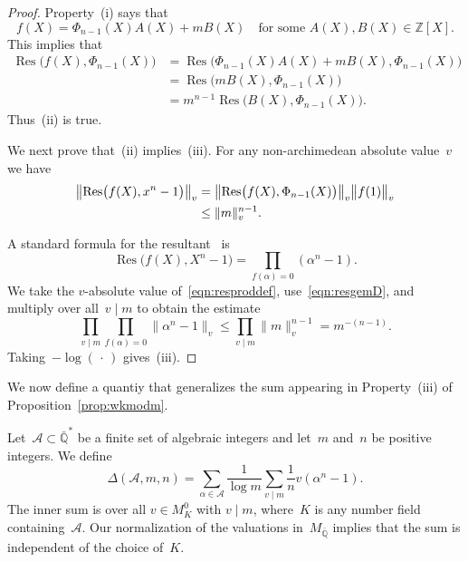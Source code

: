 \begin{proof}
Property~(i) says that
\[
  f(X) = {\Phi}_{n-1}(X)A(X) + mB(X)
  \quad\text{for some $A(X),B(X)\in{\mathbb{Z}}[X]$.}
\]
This implies that
\begin{align*}
  {\operatorname{Res}}\bigl(f(X),{\Phi}_{n-1}(X)\bigr)
  &= {\operatorname{Res}}\bigl({\Phi}_{n-1}(X)A(X) + mB(X),{\Phi}_{n-1}(X)\bigr)\\
  &= {\operatorname{Res}}\bigl(mB(X),{\Phi}_{n-1}(X)\bigr)\\
  &= m^{n-1} {\operatorname{Res}}\bigl(B(X),{\Phi}_{n-1}(X)\bigr).
\end{align*}
Thus~(ii) is true. 
\par
We next prove that~(ii) implies~(iii).  For any non-archimedean
absolute value~$v$ we have
\begin{align}
  \label{eqn:resgemD}
  \bigl\|{\operatorname{Res}}\bigl(f(X),x^{n}-1\bigr)\bigr\|_v
  &= \bigl\|{\operatorname{Res}}\bigl(f(X),{\Phi}_{n-1}(X)\bigr)\bigr\|_v
     \bigl\|f(1)\bigr\|_v  \notag\\*
  &\le \|m\|_v^{n-1}.
\end{align}
\par
A standard formula for the resultant~\cite[Section~V.10]{lang:algebra}
is
\begin{equation}
  \label{eqn:resproddef}
  {\operatorname{Res}}\bigl(f(X),X^{n}-1\bigr)
  = \prod_{f({\alpha})=0} ({\alpha}^{n}-1).
\end{equation}
We take the $v$-absolute value of~\eqref{eqn:resproddef},
use~\eqref{eqn:resgemD}, and multiply over all~$v\mid m$ to obtain the
estimate
\begin{equation}
  \label{eqnvmiDaizv}
  \prod_{v\mid m} \prod_{f({\alpha})=0} \|{\alpha}^{n}-1\|_v
  \le \prod_{v\mid m} \|m\|_v^{n-1} = m^{-(n-1)}.
\end{equation}
Taking~$-\log(\,\cdot\,)$ gives~(iii).  
\end{proof}

We now define a quantiy that generalizes the sum appearing in
Property~(iii) of Proposition~\ref{prop:wkmodm}.

\begin{definition}
Let~${{\mathcal A}}\subset{{\bar{\mathbb{Q}}}}^*$ be a finite set of algebraic integers and
let~$m$ and~$n$ be positive integers. We define
\[
  \Delta({{\mathcal A}},m,n) 
  = \sum_{{\alpha}\in{{\mathcal A}}}  \frac{1}{\log m} \sum_{v\mid m} \frac{1}{n} v({\alpha}^n-1).
\]
The inner sum is over all $v\in M_K^0$ with $v\mid m$, where~$K$ is
any number field containing~${{\mathcal A}}$. Our normalization of the
valuations in~$M_{{\bar{\mathbb{Q}}}}$ implies that the sum is independent of the
choice of~$K$.
\end{definition}

